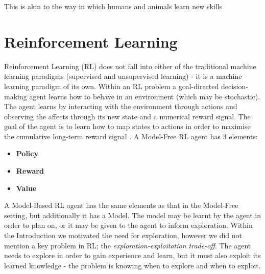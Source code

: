 This is akin to the way in which humans and animals learn new skills 
\section{Reinforcement Learning}
Reinforcement Learning (RL) does not fall into either of the traditional machine learning paradigms (supervised and unsupervised learning) - it is a machine learning paradigm of its own. Within an RL problem a goal-directed decision-making agent learns how to behave in an environment (which may be stochastic). The agent learns by interacting with the environment through actions and observing the affects through its new state and a numerical reward signal. The goal of the agent is to learn how to map states to actions in order to maximise the cumulative long-term reward signal \cite{DBLP:books/lib/SuttonB98}.
A Model-Free RL agent has 3 elements:
\begin{itemize}
    \item \textbf{Policy}
    \item \textbf{Reward}
    \item \textbf{Value}
\end{itemize}
A Model-Based RL agent has the same elements as that in the Model-Free setting, but additionally it has a Model. The model may be learnt by the agent in order to plan on, or it may be given to the agent to inform exploration.
Within the Introduction we motivated the need for exploration, however we did not mention a key problem in RL; the \textit{exploration-exploitation trade-off}. The agent needs to explore in order to gain experience and learn, but it must also exploit its learned knowledge - the problem is knowing when to explore and when to exploit.
